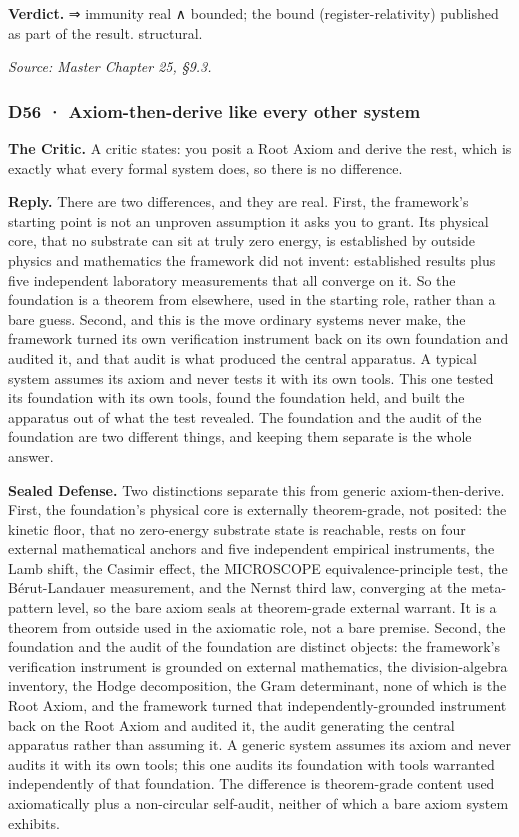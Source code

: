 \documentclass[10pt,twocolumn]{article}
\begin{document}
\textbf{Verdict.} ⇒ immunity real ∧ bounded; the bound
(register-relativity) published as part of the result. structural.

\emph{Source: Master Chapter 25, §9.3.}

\hypertarget{d56-axiom-then-derive-like-every-other-system}{%
\subsubsection{D56 · Axiom-then-derive like every other
system}\label{d56-axiom-then-derive-like-every-other-system}}

\textbf{The Critic.} A critic states: you posit a Root Axiom and derive
the rest, which is exactly what every formal system does, so there is no
difference.

\textbf{Reply.} There are two differences, and they are real. First, the
framework's starting point is not an unproven assumption it asks you to
grant. Its physical core, that no substrate can sit at truly zero
energy, is established by outside physics and mathematics the framework
did not invent: established results plus five independent laboratory
measurements that all converge on it. So the foundation is a theorem
from elsewhere, used in the starting role, rather than a bare guess.
Second, and this is the move ordinary systems never make, the framework
turned its own verification instrument back on its own foundation and
audited it, and that audit is what produced the central apparatus. A
typical system assumes its axiom and never tests it with its own tools.
This one tested its foundation with its own tools, found the foundation
held, and built the apparatus out of what the test revealed. The
foundation and the audit of the foundation are two different things, and
keeping them separate is the whole answer.

\textbf{Sealed Defense.} Two distinctions separate this from generic
axiom-then-derive. First, the foundation's physical core is externally
theorem-grade, not posited: the kinetic floor, that no zero-energy
substrate state is reachable, rests on four external mathematical
anchors and five independent empirical instruments, the Lamb shift, the
Casimir effect, the MICROSCOPE equivalence-principle test, the
Bérut-Landauer measurement, and the Nernst third law, converging at the
meta-pattern level, so the bare axiom seals at theorem-grade external
warrant. It is a theorem from outside used in the axiomatic role, not a
bare premise. Second, the foundation and the audit of the foundation are
distinct objects: the framework's verification instrument is grounded on
external mathematics, the division-algebra inventory, the Hodge
decomposition, the Gram determinant, none of which is the Root Axiom,
and the framework turned that independently-grounded instrument back on
the Root Axiom and audited it, the audit generating the central
apparatus rather than assuming it. A generic system assumes its axiom
and never audits it with its own tools; this one audits its foundation
with tools warranted independently of that foundation. The difference is
theorem-grade content used axiomatically plus a non-circular self-audit,
neither of which a bare axiom system exhibits.
\end{document}
